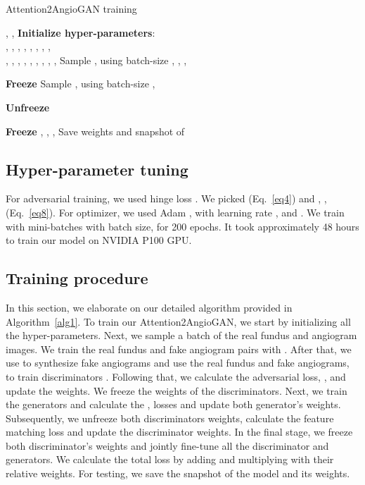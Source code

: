 \documentclass[a4paper,conference]{IEEEtran}
\begin{document}
\begin{algorithm}[h]
\caption{Attention2AngioGAN training}
\label{alg1}
\begin{algorithmic}[1]
 \renewcommand{\algorithmicrequire}{\textbf{Input:}}
 \renewcommand{\algorithmicensure}{\textbf{Output:}}
  \REQUIRE , 
 \ENSURE , 
  \STATE \textbf{Initialize hyper-parameters}: \\, , , , , ,   , , \\  , , , , ,  , , , ,  
  \FOR{}
  \STATE Sample , using batch-size  
    \FOR{}
\STATE ,   
        \STATE ,   
        \STATE , 
        \STATE 
        \STATE 
         \STATE 
    \ENDFOR
    \item[] \textbf{Freeze }
    \STATE Sample , using batch-size 
    \STATE ,
    \STATE 
    \STATE 
    \STATE 
    \STATE 
    \STATE 
    \item[] \textbf{Unfreeze }
    \STATE   
    \STATE 
    \STATE 
    \STATE 
    \item[] \textbf{Freeze }
    \STATE ,   
    \STATE ,   
    \STATE , 
    \STATE 
    \STATE 
    \STATE 
    \STATE Save weights and snapshot of 
    \STATE 
  \ENDFOR
\end{algorithmic}
\end{algorithm}



\subsection{Hyper-parameter tuning}
\label{subsec:hyper}
For adversarial training, we used hinge loss \cite{zhang2019self,lim2017geometric}. We picked  (Eq.~\ref{eq4}) and , ,  (Eq.~\ref{eq8}). For optimizer, we used Adam \cite{kingma2014adam}, with learning rate ,  and . We train with mini-batches with batch size,  for 200 epochs. It took approximately 48 hours to train our model on NVIDIA P100 GPU.




\subsection{Training procedure}
\label{subsec:training}
In this section, we elaborate on our detailed algorithm provided in Algorithm~\ref{alg1}. To train our Attention2AngioGAN, we start by initializing all the hyper-parameters. Next, we sample a batch of the real fundus and angiogram  images. We train the real fundus and fake angiogram pairs with . After that, we use  to synthesize fake angiograms and use the real fundus and fake angiograms,  to train discriminators . Following that, we calculate the adversarial loss, , and update the weights. We freeze the weights of the discriminators. Next, we train the generators and calculate the ,  losses and update both generator's weights.  Subsequently, we unfreeze both discriminators weights, calculate the feature matching loss   and update the discriminator weights. In the final stage, we freeze both discriminator's weights and jointly fine-tune all the discriminator and generators. We calculate the total loss by adding and multiplying with their relative weights. For testing, we save the snapshot of the model and its weights.
\end{document}
